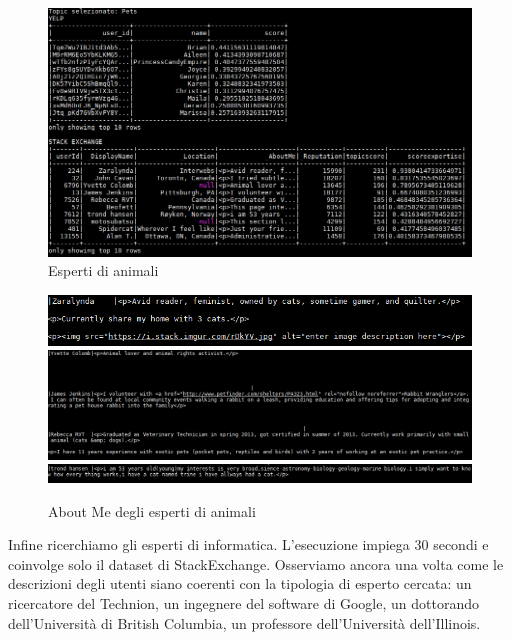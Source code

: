 \begin{figure}[H]
	\centering
	\includegraphics[scale=0.7]{image/pets.PNG}
	\caption{Esperti di animali}
	\label{fig:pets}
\end{figure}
\begin{figure}[H]
	\centering
	\includegraphics[scale=0.8]{image/pets2.PNG}
	\includegraphics[width=16cm]{image/pets3.PNG}
	\includegraphics[width=16cm]{image/pets4.PNG}
	\caption{About Me degli esperti di animali}
	\label{fig:abme}
\end{figure}

Infine ricerchiamo gli esperti di informatica. L'esecuzione impiega 30 secondi e coinvolge solo il dataset di StackExchange. Osserviamo ancora una volta come le descrizioni degli utenti siano coerenti con la tipologia di esperto cercata: un ricercatore del Technion, un ingegnere del software di Google, un dottorando dell'Università di British Columbia, un professore dell'Università dell'Illinois.

